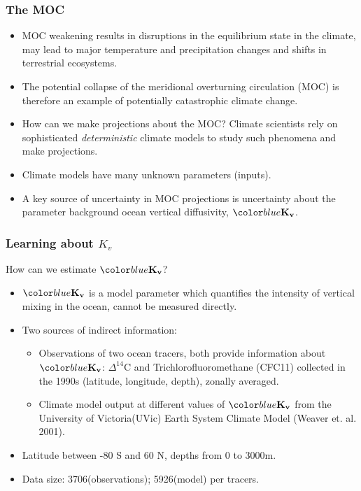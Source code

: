 \documentclass{beamer}
\begin{document}
\begin{frame}
  \frametitle{The MOC }
  \begin{itemize}
  \item MOC weakening results in disruptions in the equilibrium state
    in the climate, may lead to major temperature and precipitation
    changes and shifts in terrestrial ecosystems. %
  \item The potential collapse of the meridional overturning
    circulation (MOC) is therefore an example of potentially
    catastrophic climate change.
\item How can we make projections about the MOC? Climate scientists
  rely on sophisticated {\it deterministic} climate models to study such phenomena and
  make projections.
\item Climate models have many unknown parameters (inputs). 
\item A key source of uncertainty in MOC projections is uncertainty
  about the parameter background ocean vertical diffusivity, $\Kv$.
    \end{itemize}
  \end{frame}

\begin{frame}
\frametitle{Learning about $K_v$ }
How can we estimate $\Kv$?
 \begin{itemize}
\item $\Kv$ is a model parameter which quantifies the intensity of
  vertical mixing in the ocean, cannot be measured directly.
\item Two sources of indirect information:
\begin{itemize}
\item Observations of two ocean tracers, both provide information
  about $\Kv$: $\Delta^{14}$C  and Trichlorofluoromethane (CFC11)
  collected in the 1990s (latitude, longitude, depth), zonally
  averaged. 
\item Climate model output at different values of $\Kv$ from the
  University of Victoria(UVic) Earth System Climate Model (Weaver
  et. al. 2001).
 \end{itemize}
\item Latitude between -80 S and 60 N, depths from 0 to 3000m.
     \item Data size: 3706(observations); 5926(model) per tracers.
 \end{itemize}

\end{frame}
\end{document}
